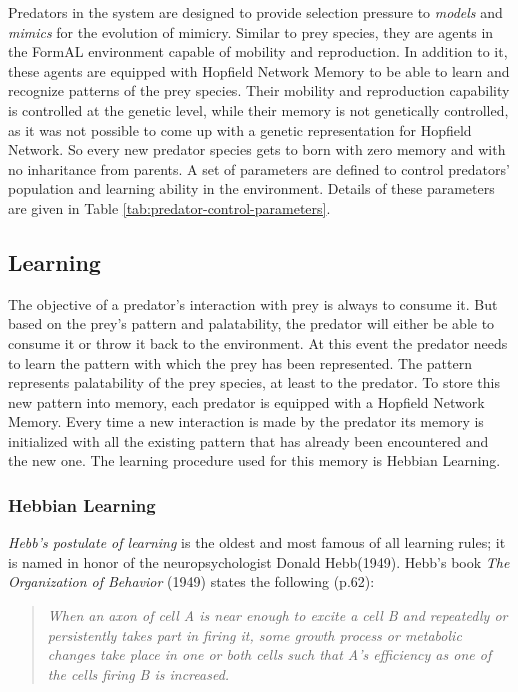 Predators in the system are designed to provide selection pressure to \textit{models} and \textit{mimics} for the evolution of mimicry. Similar to prey species, they are agents in the FormAL environment capable of mobility and reproduction. In addition to it, these agents are equipped with Hopfield Network Memory to be able to learn and recognize patterns of the prey species. Their mobility and reproduction capability is controlled at the genetic level, while their memory is not genetically controlled, as it was not possible to come up with a genetic representation for Hopfield Network. So every new predator species gets to born with zero memory and with no inharitance from parents. A set of parameters are defined to control predators' population and learning ability in the environment. Details of these parameters are given in Table \ref{tab:predator-control-parameters}.

\subsection{Learning}
The objective of a predator's interaction with prey is always to consume it. But based on the prey's pattern and palatability, the predator will either be able to consume it or throw it back to the environment. At this event the predator needs to learn the pattern with which the prey has been represented. The pattern represents palatability of the prey species, at least to the predator. To store this new pattern into memory, each predator is equipped with a Hopfield Network Memory. Every time a new interaction is made by the predator its memory is initialized with all the existing pattern that has already been encountered and the new one. The learning procedure used for this memory is Hebbian Learning. 

\subsubsection{Hebbian Learning}
\textit{Hebb's postulate of learning} is the oldest and most famous of all learning rules; it is named in honor of the neuropsychologist Donald Hebb(1949). Hebb's book \textit{The Organization of Behavior} (1949) states the following (p.62):

\begin{quote}
\textsl{When an axon of cell A is near enough to excite a cell B and repeatedly or persistently takes part in firing it, some growth process or metabolic changes take place in one or both cells such that A's efficiency as one of the cells firing B is increased.}
\end{quote}


